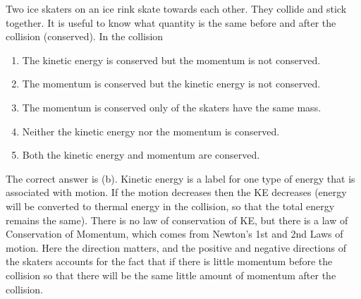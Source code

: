 
\begin{problem}[Robin2]
{Two ice skaters on an ice rink skate towards each other. They collide and stick together. It is useful to know what quantity is the same before and after the collision (conserved). In the collision 
\begin{enumerate}
	\item The kinetic energy is conserved but the momentum is not conserved.
	\item The momentum is conserved but the kinetic energy is not conserved. \answer
	\item The momentum is conserved only of the skaters have the same mass.
	\item Neither the kinetic energy nor the momentum is conserved. 
	\item Both the kinetic energy and momentum are conserved.
\end{enumerate}
}
{}
{The correct answer is (b).  Kinetic energy is a label for one type of energy that is associated with motion. If the motion decreases then the KE decreases (energy will be converted to thermal energy in the collision, so that the total energy remains the same). There is no law of conservation of KE, but there is a law of Conservation of Momentum, which comes from Newton's 1st and 2nd  Laws of motion. Here the direction matters, and the positive and negative directions of the skaters accounts for the fact that if there is little momentum before the collision so that there will be the same little amount of momentum after the collision.}
\end{problem}